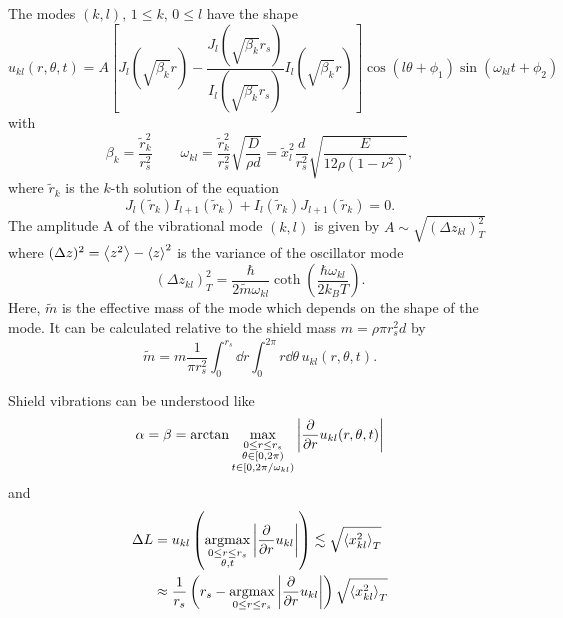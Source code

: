 The modes $(k,l),\, 1 \leq k, \, 0 \leq l$ have the shape
\begin{equation}
  u_{kl}(r, \theta, t) = A\left[J_l(\sqrt{\beta_k}r) - \frac{J_l(\sqrt{\beta_k}r_s)}{I_l(\sqrt{\beta_k}r_s)}I_l(\sqrt{\beta_k}r)\right]\cos(l\theta+\phi_1)\sin(\omega_{kl}t+\phi_2)
\end{equation}
with
\begin{equation}
  \beta_k = \frac{\tilde{r}_k^2}{r_s^2} \quad \quad \omega_{kl} = \frac{\tilde{r}_k^2}{r_s^2}\sqrt{\frac{D}{\rho d}} = \tilde{x}_l^2\frac{d}{r_s^2}\sqrt{\frac{E}{12\rho(1-\nu^2)}} ,
\end{equation}
where $\tilde{r}_k$ is the $k$-th solution of the equation
\begin{equation}
  J_l(\tilde{r}_k)I_{l+1}(\tilde{r}_k)+I_l(\tilde{r}_k)J_{l+1}(\tilde{r}_k) = 0 .
\end{equation}
The amplitude A of the vibrational mode $(k,l)$ is given by $A \sim \sqrt{(\Delta z_{kl})^2_T}$ where $(\Delta z)^2 = \left\langle z^2\right\rangle - \left\langle z\right\rangle^2$ is the variance of the oscillator mode
\begin{equation}
  (\Delta z_{kl})^2_T = \frac{\hbar}{2\tilde{m}\omega_{kl}} \coth(\frac{\hbar \omega_{kl}}{2 k_B T}) .
\end{equation}
Here, $\tilde{m}$ is the effective mass of the mode which depends on the shape of the mode. It can be calculated relative to the shield mass $m=\rho \pi r_s^2 d$ by
\begin{equation}
  \tilde{m} = m\frac{1}{\pi r_s^2}\int_0^{r_s} \dd r \int_0^{2\pi} r\dd\theta \, u_{kl}(r, \theta, t) .
\end{equation}

Shield vibrations can be understood like
\begin{equation}
  \alpha = \beta = \arctan{\max_{\substack{0 \leq r \leq r_s \\ \theta \in[0, 2\pi) \\ t \in [0,2\pi/\omega_{kl})}} \left\lvert\pdv{r}u_{kl}(r,\theta,t)\right\rvert}
\end{equation}
and
\begin{align}
  \Delta L &= u_{kl}\left(\operatorname*{arg max}_{\substack{0 \leq r \leq r_s \\ \theta, t}} \left\lvert\pdv{r}u_{kl}\right\rvert \right) \lesssim \sqrt{\left\langle x_{kl}^2\right\rangle_T} \\
  &\approx \frac{1}{r_s} \left(r_s - \operatorname*{arg max}_{0 \leq r \leq r_s}\left\lvert\pdv{r}u_{kl}\right\rvert\right)\sqrt{\left\langle x_{kl}^2\right\rangle_T}
\end{align}


